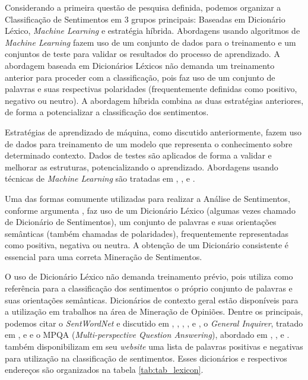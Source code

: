 \documentclass[12pt]{article}
\begin{document}
Considerando a primeira questão de pesquisa definida, podemos organizar a Classificação de Sentimentos em 3 grupos principais: Baseadas em Dicionário Léxico, \emph{Machine Learning} e estratégia híbrida. Abordagens usando algoritmos de \emph{Machine Learning} fazem uso de um conjunto de dados para o treinamento e um conjuntos de teste para validar os resultados do processo de aprendizado. A abordagem baseada em Dicionários Léxicos não demanda um treinamento anterior para proceder com a classificação, pois faz uso de um conjunto de palavras e suas respectivas polaridades (frequentemente definidas como positivo, negativo ou neutro). A abordagem híbrida combina as duas estratégias anteriores, de forma a potencializar a classificação dos sentimentos.

Estratégias de aprendizado de máquina, como discutido anteriormente, fazem uso de dados para treinamento de um modelo que representa o conhecimento sobre determinado contexto. Dados de testes são aplicados de forma a validar e melhorar as estruturas, potencializando o aprendizado. Abordagens usando técnicas de \emph{Machine Learning} são tratadas em \cite{gilbert2014vader}, \cite{HADDI2013}, \cite{ALGAAL} e \cite{taboada2011lexicon}.

Uma das formas comumente utilizadas para realizar a Análise de Sentimentos, conforme argumenta \cite{kdir16}, faz uso de um Dicionário Léxico (algumas vezes chamado de Dicionário de Sentimentos), um conjunto de palavras e suas orientações semânticas (também chamadas de polaridades), frequentemente representadas como positiva, negativa ou neutra. A obtenção de um Dicionário consistente é essencial para uma correta Mineração de Sentimentos. 

O uso de Dicionário Léxico não demanda treinamento prévio, pois utiliza como referência para a classificação dos sentimentos o próprio conjunto de palavras e suas orientações semânticas. Dicionários de contexto geral estão disponíveis para a utilização em trabalhos na área de Mineração de Opiniões. Dentre os principais, podemos citar o \emph{SentWordNet} e discutido em \cite{Zhou2014}, \cite{Alessia}, \cite{Iqbal}, \cite{ALGAAL}, \cite{SentiFulGA} e \cite{kdir16}, o \emph{General Inquirer}, tratado em \cite{taboada2011lexicon}, \cite{Zhou2014} e \cite{Alessia} e o MPQA (\emph{Multi-perspective Question Answering}), abordado em \cite{wilson2005recognizing}, \cite{becker2013}, \cite{taboada2011lexicon} e \cite{musto2014comparison}. \cite{HuAndLiu2004} também disponibilizam em seu \emph{website} uma lista de palavras positivas e negativas para utilização na classificação de sentimentos. Esses dicionários e respectivos endereços são organizados na tabela \ref{tab:tab_lexicon}.
\end{document}
